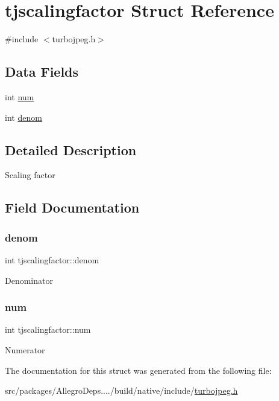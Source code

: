 \hypertarget{structtjscalingfactor}{}\section{tjscalingfactor Struct Reference}
\label{structtjscalingfactor}


{\ttfamily \#include $<$turbojpeg.\+h$>$}

\subsection*{Data Fields}
\begin{DoxyCompactItemize}
\item 
int \hyperlink{structtjscalingfactor_a9b011e57f981ee23083e2c1aa5e640ec}{num}
\item 
int \hyperlink{structtjscalingfactor_aefbcdf3e9e62274b2d312c695f133ce3}{denom}
\end{DoxyCompactItemize}


\subsection{Detailed Description}
Scaling factor 

\subsection{Field Documentation}
\mbox{\label{structtjscalingfactor_aefbcdf3e9e62274b2d312c695f133ce3}} 
\subsubsection{\texorpdfstring{denom}{denom}}
{\footnotesize\ttfamily int tjscalingfactor\+::denom}

Denominator \mbox{\label{structtjscalingfactor_a9b011e57f981ee23083e2c1aa5e640ec}} 
\subsubsection{\texorpdfstring{num}{num}}
{\footnotesize\ttfamily int tjscalingfactor\+::num}

Numerator 

The documentation for this struct was generated from the following file\+:\begin{DoxyCompactItemize}
\item 
src/packages/\+Allegro\+Deps..../build/native/include/\hyperlink{turbojpeg_8h}{turbojpeg.\+h}\end{DoxyCompactItemize}
